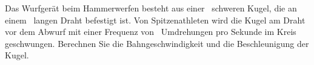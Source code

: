 Das Wurfgerät beim Hammerwerfen besteht aus einer \mHwO\ schweren Kugel, die an einem \rHwO\ langen Draht befestigt ist. Von Spitzenathleten wird die Kugel am Draht vor dem Abwurf mit einer Frequenz von \nHwO~Umdrehungen pro Sekunde im Kreis geschwungen. Berechnen Sie die Bahngeschwindigkeit und die Beschleunigung der Kugel.
